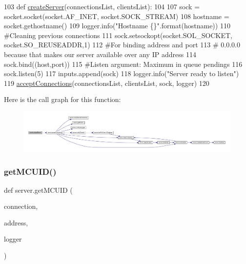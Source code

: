 \begin{DoxyCode}
103 \textcolor{keyword}{def }\hyperlink{namespaceserver_a240f07b12d57cfa5cff5612501fe7dc8}{createServer}(connectionsList, clientsList):
104      
107      sock = socket.socket(socket.AF\_INET, socket.SOCK\_STREAM)
108      hostname = socket.gethostname()
109      logger.info(\textcolor{stringliteral}{"Hostname \{\}"}.format(hostname))
110      \textcolor{comment}{#Cleaning previous connections}
111      sock.setsockopt(socket.SOL\_SOCKET, socket.SO\_REUSEADDR,1)
112      \textcolor{comment}{#For binding address and port}
113      \textcolor{comment}{# 0.0.0.0 because that makes our server available over any IP address}
114      sock.bind((host,port))
115      \textcolor{comment}{#Listen argument: Maximum in queue pendings}
116      sock.listen(5)
117      inputs.append(sock)
118      logger.info(\textcolor{stringliteral}{"Server ready to listen"})
119      \hyperlink{namespaceserver_ac1ec62c626a3425033381ef5718ce12b}{acceptConnections}(connectionsList, clientsList, sock, logger)
120 
\end{DoxyCode}
Here is the call graph for this function\+:
\nopagebreak
\begin{figure}[H]
\begin{center}
\leavevmode
\includegraphics[width=350pt]{namespaceserver_a240f07b12d57cfa5cff5612501fe7dc8_cgraph}
\end{center}
\end{figure}
\mbox{\label{namespaceserver_a26f3a1d49ee9e013ed77fbcb273a99be}} 
\subsubsection{\texorpdfstring{get\+M\+C\+U\+I\+D()}{getMCUID()}}
{\footnotesize\ttfamily def server.\+get\+M\+C\+U\+ID (\begin{DoxyParamCaption}\item[{}]{connection,  }\item[{}]{address,  }\item[{}]{logger }\end{DoxyParamCaption})}



